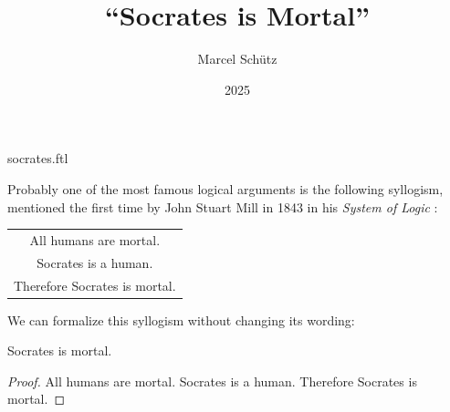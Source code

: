 \documentclass{stex}
\title{``Socrates is Mortal''}
\author{Marcel Schütz}
\date{2025}
\begin{document}
\begin{smodule}{socrates.ftl}



\maketitle

\noindent Probably one of the most famous logical arguments is the following
syllogism, mentioned the first time by John Stuart Mill in 1843
\cite{Wheeler2023} in his \textit{System of Logic}
\cite[Book II, Chapter 3]{Mill1843}:
\begin{center}
  \begin{tabular}{c}
    All humans are mortal. \\
    Socrates is a human. \\
    \hline
    Therefore Socrates is mortal.
  \end{tabular}
\end{center}
We can formalize this syllogism without changing its wording:

\begin{forthel}
  \begin{theorem}[title=Mill's Syllogism,name=Mill Syllogism]
    Socrates is mortal.
  \end{theorem}
  \begin{proof}
    All humans are mortal.
    Socrates is a human.
    Therefore Socrates is mortal.
  \end{proof}
\end{forthel}

%

\printbibliography
{}

\end{smodule}
\end{document}
